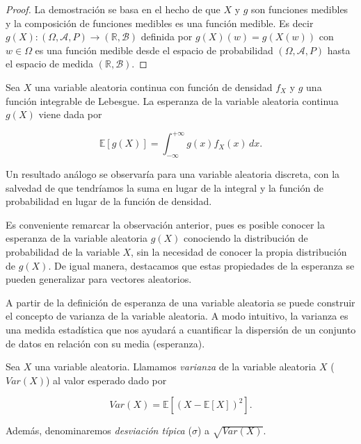 \begin{proof}
    La demostración se basa en el hecho de que $X$ y $g$ son funciones medibles y la composición de funciones medibles es una función medible. Es decir $ g(X):(\Omega, \mathcal{A}, P) \to (\mathbb{R}, \mathcal{B}) $ definida por $g(X)(w) = g(X(w))$ con $w \in \Omega$ es una función medible desde el espacio de probabilidad $(\Omega, \mathcal{A}, P)$ hasta el espacio de medida $(\mathbb{R},\mathcal{B})$.\newline
\end{proof}

\begin{observacion}
    Sea $X$ una variable aleatoria continua con función de densidad $f_X$ y $g$ una función integrable de Lebesgue. La esperanza de la variable aleatoria continua $g(X)$ viene dada por

    \[ \mathbb{E}[g(X)] =  \int_{-\infty}^{+\infty} g(x) f_{X}(x) \, dx. \]

    Un resultado análogo se observaría para una variable aleatoria discreta, con la salvedad de que tendríamos la suma en lugar de la integral y la función de probabilidad en lugar de la función de densidad.\newline
\end{observacion}

Es conveniente remarcar la observación anterior, pues es posible conocer la esperanza de la variable aleatoria $g(X)$ conociendo la distribución de probabilidad de la variable $X$, sin la necesidad de conocer la propia distribución de $g(X)$. De igual manera, destacamos que estas propiedades de la esperanza se pueden generalizar para vectores aleatorios.\newline

A partir de la definición de esperanza de una variable aleatoria se puede construir el concepto de varianza de la variable aleatoria. A modo intuitivo, la varianza es una medida estadística que nos ayudará a cuantificar la dispersión de un conjunto de datos en relación con su media (esperanza).\newline

\begin{definicion}\label{def:varianza-variable-aleatoria}
    Sea $X$ una variable aleatoria. Llamamos \emph{varianza} de la variable aleatoria $X$ ($Var(X)$) al valor esperado dado por

    \[ Var(X) = \mathbb{E}[{(X - \mathbb{E}[X])}^2]. \]

    Además, denominaremos \emph{desviación típica} ($\sigma$) a $\sqrt{Var(X)}$.\newline
\end{definicion}

